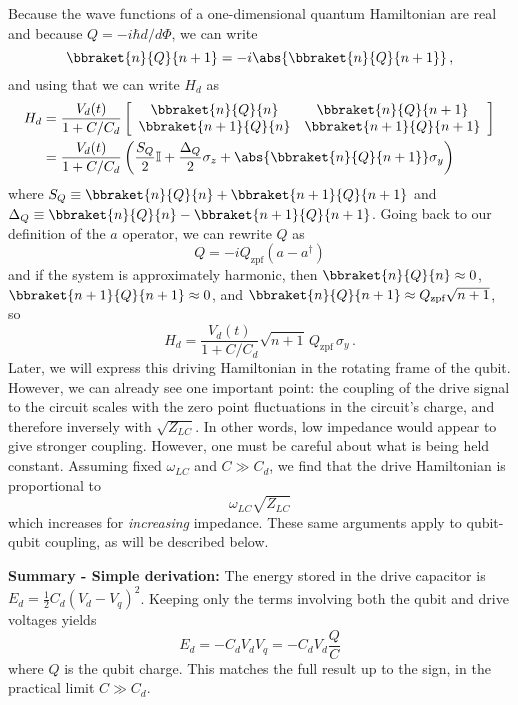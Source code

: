 Because the wave functions of a one-dimensional quantum Hamiltonian are real and because $Q = -i \hbar d/d\Phi$, we can write
\begin{equation*}
  \bbraket{n}{Q}{n+1} = -i \abs{\bbraket{n}{Q}{n+1}} \, ,
\end{equation*}
and using that we can write $H_d$ as
\begin{align*}
  H_d
  &= \frac{V_d(t)}{1 + C / C_d}
    \left[ \begin{array}{cc}
      \bbraket{n}{Q}{n} & \bbraket{n}{Q}{n+1} \\
      \bbraket{n+1}{Q}{n} & \bbraket{n+1}{Q}{n+1}
    \end{array}\right] \\
  &= \frac{V_d(t)}{1 + C / C_d} \left(
      \frac{S_Q}{2} \mathbb{I}
    + \frac{\Delta_Q}{2} \sigma_z
    + \abs{\bbraket{n}{Q}{n+1}} \sigma_y
  \right)
\end{align*}
where $S_Q \equiv \bbraket{n}{Q}{n} + \bbraket{n+1}{Q}{n+1}$ and $\Delta_Q \equiv \bbraket{n}{Q}{n} - \bbraket{n+1}{Q}{n+1}$.
Going back to our definition of the $a$ operator, we can rewrite $Q$ as
\begin{equation*}
  Q = -i Q_\text{zpf} (a - a^\dagger)
\end{equation*}
and if the system is approximately harmonic, then $\bbraket{n}{Q}{n} \approx 0$, $\bbraket{n+1}{Q}{n+1} \approx 0$, and $\bbraket{n}{Q}{n+1} \approx Q_\text{zpf} \sqrt{n+1}$, so
\begin{equation*}
  H_d = \frac{V_d(t)}{1 + C / C_d} \sqrt{n+1} \, Q_\text{zpf} \, \sigma_y
  \, .
\end{equation*}
Later, we will express this driving Hamiltonian in the rotating frame of the qubit.
However, we can already see one important point: the coupling of the drive signal to the circuit scales with the zero point fluctuations in the circuit's charge, and therefore inversely with $\sqrt{Z_{LC}}$.
In other words, low impedance would appear to give stronger coupling.
However, one must be careful about what is being held constant.
Assuming fixed $\omega_{LC}$ and $C \gg C_d$, we find that the drive Hamiltonian is proportional to
\begin{equation}
  \omega_{LC} \sqrt{Z_{LC}}
\end{equation}
which increases for \emph{increasing} impedance.
These same arguments apply to qubit-qubit coupling, as will be described below.

\textbf{Summary - Simple derivation:} The energy stored in the drive capacitor is $E_d = \frac{1}{2}C_d\left( V_d - V_q \right)^2$.
Keeping only the terms involving both the qubit and drive voltages yields \begin{equation}
E_d = - C_d V_d V_q = - C_d V_d \frac{Q}{C} \end{equation}
where $Q$ is the qubit charge.
This matches the full result up to the sign, in the practical limit $C \gg C_d$.


